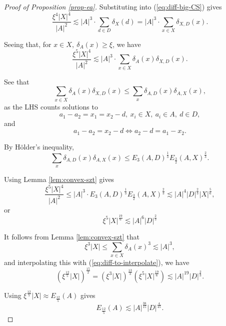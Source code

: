 \documentclass[reqno]{amsart}
\newcommand{\holder}{H\"older}
\numberwithin{equation}{section}
\begin{document}
\begin{proof}[Proof of Proposition \ref{prop-ea}]
Substituting into (\ref{eq:diff-big-CS}) gives
\[
    \frac{\xi^{4}\left\lvert X \right\rvert ^{4}}{\left\lvert A \right\rvert ^{2}} \lesssim \left\lvert A \right\rvert ^{3} \cdot \sum _{d \in D} \delta_{X} (d) = \left\lvert A \right\rvert ^{3} \cdot  \sum _{x \in X} \delta_{X,D} (x)
.\]

Seeing that, for \(x \in X,~ \delta_{A} (x) \geq \xi\), we have
\[
    \frac{\xi^{5}\left\lvert X \right\rvert ^{4}}{\left\lvert A \right\rvert ^{2}} \lesssim \left\lvert A \right\rvert ^{3}  \cdot \sum _{x \in X} \delta_{A} (x)\delta_{X,D} (x)
.\]

See that
\[
    \sum _{x \in X} \delta_{A} (x) \delta_{X,D} (x)   \leq \sum _{x} \delta_{A,D} (x) \delta_{A,X} (x)
,\]
as the LHS counts solutions to
\[
    a_1 - a_2 = x_1 = x_2 - d ,~ x_{i} \in X ,~ a_{i} \in A,~ d \in D
,\]
and
\[
    a_1 - a_2 = x_2 - d \iff a_2 - d = a_1 - x_2
.\]

By \holder's inequality,
\[
    \sum _{x} \delta_{A,D} (x) \delta_{A,X} (x)\leq E_3(A,D)^{\frac{1}{3} }E_{\frac{3}{2} } (A,X)^{\frac{2}{3} }
.\]

Using Lemma \ref{lem:convex-szt} gives
\[
    \frac{\xi^{5} \left\lvert X \right\rvert ^{4}}{\left\lvert A \right\rvert ^{2}} \leq \left\lvert A \right\rvert ^{3} \cdot E_3(A,D) ^{\frac{1}{3} }E_{\frac{3}{2} } (A,X)^{\frac{2}{3} } \lesssim \left\lvert A \right\rvert^{4} \left\lvert D \right\rvert ^{\frac{2}{3} }\left\lvert X \right\rvert ^{\frac{5}{6} }
,\]
or
\begin{equation} \label{eq:diff-to-interpolate}
\xi^{5} \left\lvert X \right\rvert ^{\frac{19}{6} }\lesssim \left\lvert A \right\rvert ^{6}\left\lvert D \right\rvert ^{\frac{2}{3} }
\end{equation}

It follows from Lemma \ref{lem:convex-szt} that
\[
    \xi^{3} \left\lvert X \right\rvert \leq \sum _{x \in X} \delta_{A} (x)^{3} \lesssim \left\lvert A \right\rvert ^{3} 
,\]
and interpolating this with (\ref{eq:diff-to-interpolate}), we have
\[
    \left( \xi^{\frac{12}{5} } \left\lvert X \right\rvert    \right)^{\frac{15}{2} }=  \left( \xi ^{3} \left\lvert X \right\rvert \right)^{\frac{13}{3} } \left( \xi^{5}\left\lvert X \right\rvert ^{\frac{19}{6} } \right)  \lesssim \left\lvert A \right\rvert ^{19}\left\lvert D \right\rvert ^{\frac{2}{3} }
.\]

Using \(\xi^{\frac{12}{5} }\left\lvert X \right\rvert \approx E_{\frac{12}{5} } (A)\) gives
\[
    E_{\frac{12}{5} } (A) \lesssim \left\lvert A \right\rvert ^{\frac{38}{15} } \left\lvert D \right\rvert ^{\frac{4}{45} }
.\]
\end{proof}
\end{document}
